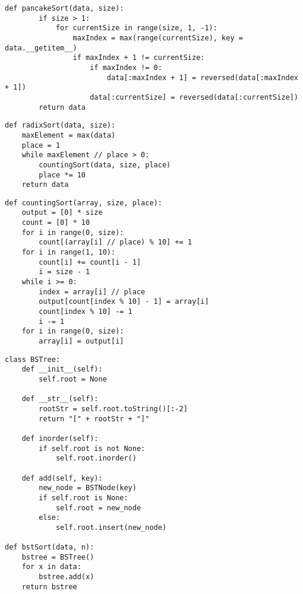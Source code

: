 \begin{center}
    \captionsetup{justification=raggedright,singlelinecheck=off}
    \begin{lstlisting}[label=lst:pancake_sort,caption=Реализация алгоритма блинной сортировки]
	def pancakeSort(data, size):
		if size > 1:
			for currentSize in range(size, 1, -1):
				maxIndex = max(range(currentSize), key = data.__getitem__)
				if maxIndex + 1 != currentSize:
					if maxIndex != 0:
						data[:maxIndex + 1] = reversed(data[:maxIndex + 1])
					data[:currentSize] = reversed(data[:currentSize])
		return data
	\end{lstlisting}
\end{center}

\begin{center}
\captionsetup{justification=raggedright,singlelinecheck=off}
\begin{lstlisting}[label=lst:radix_sort,caption=Реализация алгоритма поразрядной сортировки]
def radixSort(data, size):
	maxElement = max(data)
	place = 1
	while maxElement // place > 0:
		countingSort(data, size, place)
		place *= 10
	return data
\end{lstlisting}
\end{center}


\begin{center}
\captionsetup{justification=raggedright,singlelinecheck=off}
\begin{lstlisting}[label=lst:counting_sort,caption=Реализация алгоритма сортировки подсчётом]
def countingSort(array, size, place):
	output = [0] * size
	count = [0] * 10
	for i in range(0, size):
		count[(array[i] // place) % 10] += 1
	for i in range(1, 10):
		count[i] += count[i - 1]
		i = size - 1
	while i >= 0:
		index = array[i] // place
		output[count[index % 10] - 1] = array[i]
		count[index % 10] -= 1
		i -= 1
	for i in range(0, size):
		array[i] = output[i]
\end{lstlisting}
\end{center}

\begin{center}
	\captionsetup{justification=raggedright,singlelinecheck=off}
	\begin{lstlisting}[label=lst:bst_sort,caption=Реализация алгоритма сортировки бинарным деревом]
class BSTree:
	def __init__(self):
		self.root = None
	
	def __str__(self):
		rootStr = self.root.toString()[:-2]
		return "[" + rootStr + "]"
	
	def inorder(self):
		if self.root is not None:
			self.root.inorder()
	
	def add(self, key):
		new_node = BSTNode(key)
		if self.root is None:
			self.root = new_node
		else:
			self.root.insert(new_node)

def bstSort(data, n):
	bstree = BSTree()
	for x in data:
		bstree.add(x)
	return bstree
	\end{lstlisting}
\end{center}

